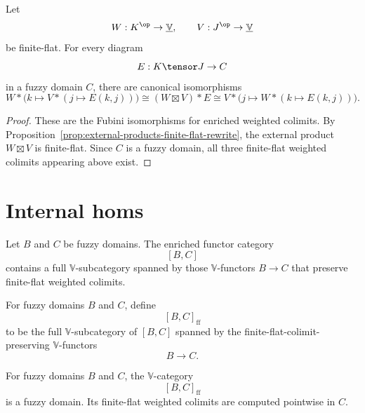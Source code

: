 \begin{proposition}
\label{prop:finite-flat-fubini-rewrite}
Let
\[
    W:K^{\op}\to\underline{\mathbb V},
    \qquad
    V:J^{\op}\to\underline{\mathbb V}
\]
be finite-flat.  For every diagram
\[
    E:K\tensor J\to C
\]
in a fuzzy domain \(C\), there are canonical isomorphisms
\[
    W*\bigl(k\mapsto V*(j\mapsto E(k,j))\bigr)
    \cong
    (W\boxtimes V)*E
    \cong
    V*\bigl(j\mapsto W*(k\mapsto E(k,j))\bigr).
\]
\end{proposition}

\begin{proof}
These are the Fubini isomorphisms for enriched weighted colimits.  By
Proposition~\ref{prop:external-products-finite-flat-rewrite}, the external
product \(W\boxtimes V\) is finite-flat.  Since \(C\) is a fuzzy domain, all
three finite-flat weighted colimits appearing above exist.
\end{proof}

\section{Internal homs}
\label{sec:internal-homs-fdom-rewrite}

Let \(B\) and \(C\) be fuzzy domains.  The enriched functor category
\[
    [B,C]
\]
contains a full \(\mathbb V\)-subcategory spanned by those
\(\mathbb V\)-functors \(B\to C\) that preserve finite-flat weighted colimits.

\begin{definition}
\label{def:internal-hom-fdom-rewrite}
For fuzzy domains \(B\) and \(C\), define
\[
    [B,C]_{\mathrm{ff}}
\]
to be the full \(\mathbb V\)-subcategory of \([B,C]\) spanned by the
finite-flat-colimit-preserving \(\mathbb V\)-functors
\[
    B\to C.
\]
\end{definition}

\begin{proposition}
\label{prop:internal-homs-fdom-rewrite}
For fuzzy domains \(B\) and \(C\), the \(\mathbb V\)-category
\[
    [B,C]_{\mathrm{ff}}
\]
is a fuzzy domain.  Its finite-flat weighted colimits are computed pointwise in
\(C\).
\end{proposition}

